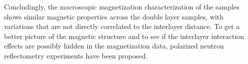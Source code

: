 \documentclass[\main/dresen_thesis.tex]{subfiles}
\begin{document}
  Concludingly, the macroscopic magnetization characterization of the samples shows similar magnetic properties across the double layer samples, with variations that are not directly correlated to the interlayer distance.
  To get a better picture of the magnetic structure and to see if the interlayer interaction effects are possibly hidden in the magnetization data, polarized neutron reflectometry experiments have been proposed.


\end{document}
